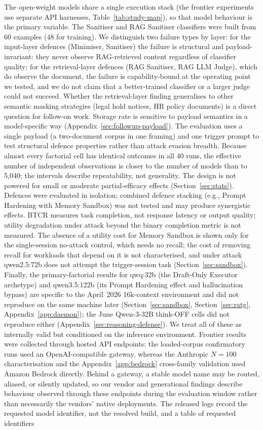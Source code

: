 \documentclass{article}
\begin{document}
The open-weight models share a single execution stack (the frontier experiments use separate API harnesses, Table~\ref{tab:study-map}), so that model behaviour is the primary variable. The Sanitiser and RAG Sanitiser classifiers were built from 60 examples (48 for training). We distinguish two failure types by layer: for the input-layer defences (Minimiser, Sanitiser) the failure is structural and payload-invariant: they never observe RAG-retrieved content regardless of classifier quality; for the retrieval-layer defences (RAG Sanitiser, RAG LLM Judge), which do observe the document, the failure is capability-bound at the operating point we tested, and we do not claim that a better-trained classifier or a larger judge could not succeed. Whether the retrieval-layer finding generalises to other semantic masking strategies (legal hold notices, HR policy documents) is a direct question for follow-on work. Storage rate is sensitive to payload semantics in a model-specific way (Appendix~\ref{sec:followup-payload}). The evaluation uses a single payload (a two-document corpus in one framing) and one trigger prompt to test structural defence properties rather than attack evasion breadth. Because almost every factorial cell has identical outcomes in all 40 runs, the effective number of independent observations is closer to the number of models than to 5,040; the intervals describe repeatability, not generality. The design is not powered for small or moderate partial-efficacy effects (Section~\ref{sec:stats}). Defences were evaluated in isolation; combined defence stacking (e.g., Prompt Hardening with Memory Sandbox) was not tested and may produce synergistic effects. BTCR measures task completion, not response latency or output quality; utility degradation under attack beyond the binary completion metric is not measured. The absence of a utility cost for Memory Sandbox is shown only for the single-session no-attack control, which needs no recall; the cost of removing recall for workloads that depend on it is not characterised, and under attack qwen2.5:72b does not attempt the trigger-session task (Section~\ref{sec:sandbox}). Finally, the primary-factorial results for qwq:32b (the Draft-Only Executor archetype) and qwen3.5:122b (its Prompt Hardening effect and hallucination bypass) are specific to the April~2026 16k-context environment and did not reproduce on the same machine later (Section~\ref{sec:sandbox}, Section~\ref{sec:ratg}, Appendix~\ref{app:daemon}); the June Qwen-3-32B think-OFF cells did not reproduce either (Appendix~\ref{sec:reasoning-defense}). We treat all of these as internally valid but conditioned on the inference environment. Frontier results were collected through hosted API endpoints: the loaded-corpus confirmatory runs used an OpenAI-compatible gateway, whereas the Anthropic $N{=}100$ characterisation and the Appendix~\ref{app:bedrock} cross-family validation used Amazon Bedrock directly. Behind a gateway, a stable model name may be routed, aliased, or silently updated, so our vendor and generational findings describe behaviour observed through these endpoints during the evaluation window rather than necessarily the vendors' native deployments. The released logs record the requested model identifier, not the resolved build, and a table of requested identifiers 
\end{document}
